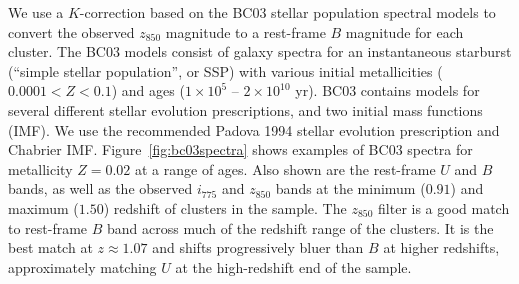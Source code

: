 
We use a $K$-correction based on the BC03 stellar population spectral
models to convert the observed $z_{850}$ magnitude to a rest-frame $B$
magnitude for each cluster. The BC03 models consist of galaxy spectra
for an instantaneous starburst (``simple stellar population'', or SSP)
with various initial metallicities ($0.0001 < Z < 0.1$) and ages
($1 \times 10^5$ -- $2 \times 10^{10}$ yr). BC03 contains models for
several different stellar evolution prescriptions, and two initial
mass functions (IMF). We use the recommended Padova 1994 stellar
evolution prescription and Chabrier IMF. Figure~\ref{fig:bc03spectra}
shows examples of BC03 spectra for metallicity $Z=0.02$ at a range of
ages. Also shown are the rest-frame $U$ and $B$ bands, as well as the
observed $i_{775}$ and $z_{850}$ bands at the minimum ($0.91$) and
maximum ($1.50$) redshift of clusters in the sample. The $z_{850}$
filter is a good match to rest-frame $B$ band across much of the
redshift range of the clusters. It is the best match at $z \approx
1.07$ and shifts progressively bluer than $B$ at higher redshifts,
approximately matching $U$ at the high-redshift end of the sample.


